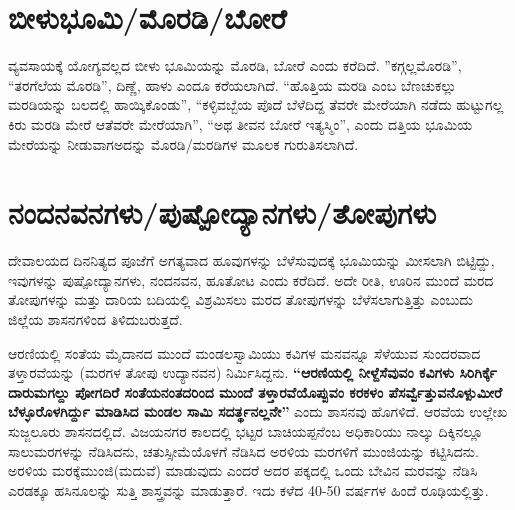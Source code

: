 \newpage

\section{ಬೀಳುಭೂಮಿ/ಮೊರಡಿ/ಬೋರೆ}

ವ್ಯವಸಾಯಕ್ಕೆ ಯೋಗ್ಯವಲ್ಲದ ಬೀಳು ಭೂಮಿಯನ್ನು ಮೊರಡಿ, ಬೋರೆ ಎಂದು ಕರೆದಿದೆ. ”ಕಗ್ಗಲ್ಲಮೊರಡಿ”, “ತರಗೆಲೆಯ ಮೊರಡಿ”, ದಿಣ್ಣೆ, ಹಾಳು ಎಂದೂ ಕರೆಯಲಾಗಿದೆ. “ಹೊತ್ತಿಯ ಮರಡಿ ಎಂಬ ಬೆಣಚುಕಲ್ಲು ಮರಡಿಯನ್ನು ಬಲದಲ್ಲಿ ಹಾಯ್ಕಿಕೊಂಡು”, “ಕಳ್ಳಿವಬ್ಬೆಯ ಪೊದೆ ಬೆಳೆದಿದ್ದ ತೆವರೇ ಮೇರೆಯಾಗಿ ನಡೆದು ಹುಟ್ಟುಗಲ್ಲ ಕಿರು ಮರಡಿ ಮೇರೆ ಆ\break ತೆವರೇ ಮೇರೆಯಾಗಿ”, “ಅಥ ತೀವನ ಬೋರೆ ಇತ್ಯಸ್ಮಿಂ”, ಎಂದು ದತ್ತಿಯ ಭೂಮಿಯ ಮೇರೆಯನ್ನು ನೀಡುವಾಗ\break ಅದನ್ನು ಮೊರಡಿ/ಮರಡಿಗಳ ಮೂಲಕ ಗುರುತಿಸಲಾಗಿದೆ.


\section{ನಂದನವನಗಳು/ಪುಷ್ಪೋದ್ಯಾನಗಳು/ತೋಪುಗಳು}

ದೇವಾಲಯದ ದಿನನಿತ್ಯದ ಪೂಜೆಗೆ ಅಗತ್ಯವಾದ ಹೂವುಗಳನ್ನು ಬೆಳೆಸುವುದಕ್ಕೆ ಭೂಮಿಯನ್ನು ಮೀಸಲಾಗಿ ಬಿಟ್ಟಿದ್ದು, ಇವುಗಳನ್ನು ಪುಷ್ಪೋದ್ಯಾನಗಳು, ನಂದನವನ, ಹೂತೋಟ ಎಂದು ಕರೆದಿದೆ. ಅದೇ ರೀತಿ, ಊರಿನ ಮುಂದೆ ಮರದ ತೋಪು\-ಗಳನ್ನು ಮತ್ತು ದಾರಿಯ ಬದಿಯಲ್ಲಿ ವಿಶ್ರಮಿಸಲು ಮರದ ತೋಪುಗಳನ್ನು ಬೆಳೆಸಲಾಗುತ್ತಿತ್ತು ಎಂಬುದು ಜಿಲ್ಲೆಯ ಶಾಸನಗಳಿಂದ ತಿಳಿದುಬರುತ್ತದೆ.

ಆರಣಿಯಲ್ಲಿ ಸಂತೆಯ ಮೈದಾನದ ಮುಂದೆ ಮಂಡಲಸ್ವಾಮಿಯು ಕವಿಗಳ ಮನವನ್ನೂ ಸೆಳೆಯುವ ಸುಂದರವಾದ ತಳ್ತಾರವೆಯನ್ನು (ಮರಗಳ ತೋಪು ಉದ್ಯಾನವನ) ನಿರ್ಮಿಸಿದ್ದನು. \textbf{“ಆರಣಿಯಲ್ಲಿ ನೀಳ್ದೆಸೆವುವಂ ಕವಿಗಳು ಸಿರಿಗಿರ್ಕ್ಕೆ ದಾರುಮಗಲ್ದು ಪೋಗದಿರೆ ಸಂತೆಯನಂತದರಿಂದ ಮುಂದೆ ತಳ್ತಾರವೆಯೊಪ್ಪುವಂ ಕರಕಳಂ ಪೆಸರ್ವ್ವೆತ್ತುವನೊಳ್ಪುಮೀರೆ ಬೆಳ್ಳೂರೊಳ\-ಗಿರ್ದ್ದು ಮಾಡಿಸಿದ ಮಂಡಲ ಸಾಮಿ ಸದರ್ತ್ಥನಲ್ಲನೇ”} ಎಂದು ಶಾಸನವು ಹೊಗಳಿದೆ. ಆರವೆಯ ಉಲ್ಲೇಖ ಸುಜ್ಜಲೂರು ಶಾಸನದಲ್ಲಿದೆ. ವಿಜಯನಗರ ಕಾಲದಲ್ಲಿ ಭಟ್ಟರ ಬಾಚಿಯಪ್ಪನೆಂಬ ಅಧಿಕಾರಿಯು ನಾಲ್ಕು ದಿಕ್ಕಿನಲ್ಲೂ ಸಾಲುಮರಗಳನ್ನು ನೆಡಿಸಿದನು, ಚತುಸ್ಸೀಮೆಯೊಳಗೆ ನೆಡಿಸಿದ ಅರಳಿಯ ಮರಗಳಿಗೆ ಮುಂಜಿಯನ್ನು ಕಟ್ಟಿಸಿದನು. ಅರಳಿಯ ಮರಕ್ಕೆ\break ಮುಂಜಿ(ಮದುವೆ) ಮಾಡುವುದು ಎಂದರೆ ಅದರ ಪಕ್ಕದಲ್ಲಿ ಒಂದು ಬೇವಿನ ಮರವನ್ನು ನೆಡಿಸಿ ಎರಡಕ್ಕೂ ಹಸಿನೂಲನ್ನು ಸುತ್ತಿ ಶಾಸ್ತ್ರವನ್ನು ಮಾಡುತ್ತಾರೆ. ಇದು ಕಳೆದ 40-50 ವರ್ಷಗಳ ಹಿಂದೆ ರೂಢಿಯಲ್ಲಿತ್ತು.

